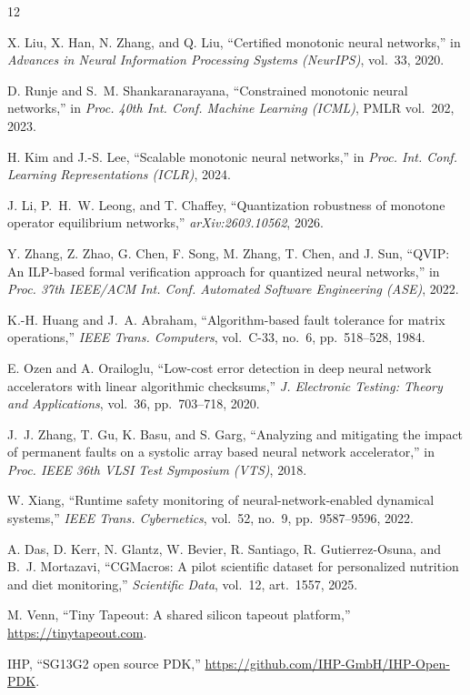 \documentclass[conference]{IEEEtran}
\begin{document}
\begin{thebibliography}{12}

X. Liu, X. Han, N. Zhang, and Q. Liu, ``Certified monotonic neural networks,''
in \emph{Advances in Neural Information Processing Systems (NeurIPS)}, vol.~33,
2020.

D. Runje and S.~M. Shankaranarayana, ``Constrained monotonic neural networks,''
in \emph{Proc. 40th Int. Conf. Machine Learning (ICML)}, PMLR vol.~202, 2023.

H. Kim and J.-S. Lee, ``Scalable monotonic neural networks,'' in \emph{Proc.
Int. Conf. Learning Representations (ICLR)}, 2024.

J. Li, P.~H.~W. Leong, and T. Chaffey, ``Quantization robustness of monotone
operator equilibrium networks,'' \emph{arXiv:2603.10562}, 2026.

Y. Zhang, Z. Zhao, G. Chen, F. Song, M. Zhang, T. Chen, and J. Sun, ``QVIP: An
ILP-based formal verification approach for quantized neural networks,'' in
\emph{Proc. 37th IEEE/ACM Int. Conf. Automated Software Engineering (ASE)},
2022.

K.-H. Huang and J.~A. Abraham, ``Algorithm-based fault tolerance for matrix
operations,'' \emph{IEEE Trans. Computers}, vol.~C-33, no.~6, pp.~518--528,
1984.

E. Ozen and A. Orailoglu, ``Low-cost error detection in deep neural network
accelerators with linear algorithmic checksums,'' \emph{J. Electronic Testing:
Theory and Applications}, vol.~36, pp.~703--718, 2020.

J.~J. Zhang, T. Gu, K. Basu, and S. Garg, ``Analyzing and mitigating the impact
of permanent faults on a systolic array based neural network accelerator,'' in
\emph{Proc. IEEE 36th VLSI Test Symposium (VTS)}, 2018.

W. Xiang, ``Runtime safety monitoring of neural-network-enabled dynamical
systems,'' \emph{IEEE Trans. Cybernetics}, vol.~52, no.~9, pp.~9587--9596, 2022.

A. Das, D. Kerr, N. Glantz, W. Bevier, R. Santiago, R. Gutierrez-Osuna, and
B.~J. Mortazavi, ``CGMacros: A pilot scientific dataset for personalized
nutrition and diet monitoring,'' \emph{Scientific Data}, vol.~12, art.~1557,
2025.

M. Venn, ``Tiny Tapeout: A shared silicon tapeout platform,''
\url{https://tinytapeout.com}. %

IHP, ``SG13G2 open source PDK,''
\url{https://github.com/IHP-GmbH/IHP-Open-PDK}.

\end{thebibliography}
\end{document}
